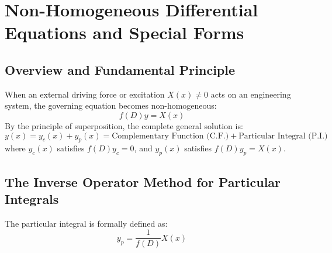 \chapter{Non-Homogeneous Differential Equations and Special Forms}
\label{chap:lde-2}

\section{Overview and Fundamental Principle}
When an external driving force or excitation $X(x) \neq 0$ acts on an engineering system, the governing equation becomes non-homogeneous:
\begin{equation}
f(D)y = X(x)
\end{equation}
By the principle of superposition, the complete general solution is:
\begin{equation}
y(x) = y_c(x) + y_p(x) = \text{Complementary Function (C.F.)} + \text{Particular Integral (P.I.)}
\end{equation}
where $y_c(x)$ satisfies $f(D)y_c = 0$, and $y_p(x)$ satisfies $f(D)y_p = X(x)$.

\section{The Inverse Operator Method for Particular Integrals}
The particular integral is formally defined as:
\begin{equation}
y_p = \frac{1}{f(D)} X(x)
\end{equation}

